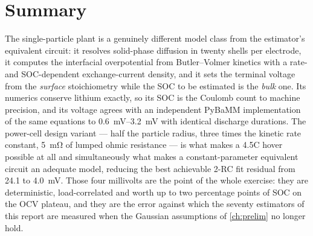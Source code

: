 \section{Summary}

The single-particle plant is a genuinely different model class from the estimator's equivalent
circuit: it resolves solid-phase diffusion in twenty shells per electrode, it computes the
interfacial overpotential from Butler--Volmer kinetics with a rate- and SOC-dependent
exchange-current density, and it sets the terminal voltage from the \emph{surface} stoichiometry
while the SOC to be estimated is the \emph{bulk} one. Its numerics conserve lithium exactly, so
its SOC is the Coulomb count to machine precision, and its voltage agrees with an independent
PyBaMM implementation of the same equations to \SIrange{0.6}{3.2}{\milli\volt} with identical
discharge durations. The power-cell design variant --- half the particle radius, three times the
kinetic rate constant, \SI{5}{\milli\ohm} of lumped ohmic resistance --- is what makes a 4.5C
hover possible at all and simultaneously what makes a constant-parameter equivalent circuit an
adequate model, reducing the best achievable 2-RC fit residual from \SI{24.1}{} to
\SI{4.0}{\milli\volt}. Those four millivolts are the point of the whole exercise: they are
deterministic, load-correlated and worth up to two percentage points of SOC on the OCV plateau,
and they are the error against which the seventy estimators of this report are measured when the
Gaussian assumptions of \cref{ch:prelim} no longer hold.
